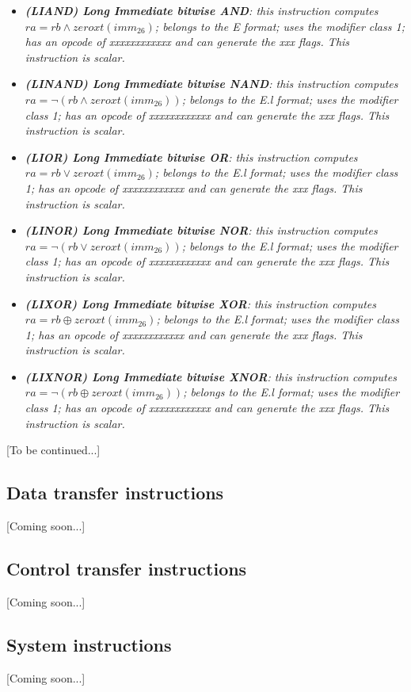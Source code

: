 \begin{multicols}{2}
\begin{itemize}
                \item \textit{\textbf{(LIAND) Long Immediate bitwise AND}: this instruction computes \(ra = rb \wedge zeroxt(imm_{26})\); belongs to the E format; uses the modifier class 1; has an opcode of xxxxxxxxxxxx and can generate the xxx flags. This instruction is scalar.}

                \item \textit{\textbf{(LINAND) Long Immediate bitwise NAND}: this instruction computes \(ra = \neg(rb \wedge zeroxt(imm_{26}))\); belongs to the E.l format; uses the modifier class 1; has an opcode of xxxxxxxxxxxx and can generate the xxx flags. This instruction is scalar.}

                \item \textit{\textbf{(LIOR) Long Immediate bitwise OR}: this instruction computes \(ra = rb \vee zeroxt(imm_{26})\); belongs to the E.l format; uses the modifier class 1; has an opcode of xxxxxxxxxxxx and can generate the xxx flags. This instruction is scalar.}

                \item \textit{\textbf{(LINOR) Long Immediate bitwise NOR}: this instruction computes \(ra = \neg(rb \vee zeroxt(imm_{26}))\); belongs to the E.l format; uses the modifier class 1; has an opcode of xxxxxxxxxxxx and can generate the xxx flags. This instruction is scalar.}

                \item \textit{\textbf{(LIXOR) Long Immediate bitwise XOR}: this instruction computes \(ra = rb \oplus zeroxt(imm_{26})\); belongs to the E.l format; uses the modifier class 1; has an opcode of xxxxxxxxxxxx and can generate the xxx flags. This instruction is scalar.}

                \item \textit{\textbf{(LIXNOR) Long Immediate bitwise XNOR}: this instruction computes \(ra = \neg(rb \oplus zeroxt(imm_{26}))\); belongs to the E.l format; uses the modifier class 1; has an opcode of xxxxxxxxxxxx and can generate the xxx flags. This instruction is scalar.}


            \end{itemize}

        \end{multicols}

        [To be continued...]

    \subsection{Data transfer instructions}

        [Coming soon...]

    \subsection{Control transfer instructions}

        [Coming soon...]

    \subsection{System instructions}

        [Coming soon...]